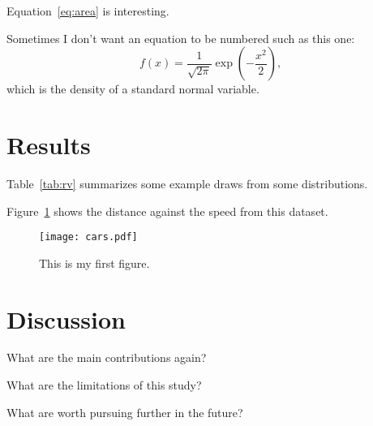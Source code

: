\documentclass[12pt]{article}
\begin{document}
Equation~\eqref{eq:area} is interesting. 

Sometimes I don't want an equation to be numbered such as this one:
\[
  f(x) = \frac{1}{\sqrt{2\pi}} \exp\left( - \frac{x^2}{2} \right),
\]
which is the density of a standard normal variable.



\section{Results}
\label{sec:resu}

Table~\ref{tab:rv} summarizes some example draws from some distributions.


Figure~\ref{fig:cars} shows the distance against the speed from this dataset.


\begin{figure}[tbp]
  \centering
  \texttt{[image: cars.pdf]}
  \caption{This is my first figure.}
  \label{fig:cars}
\end{figure}

\section{Discussion}
\label{sec:disc}

What are the main contributions again?

What are the limitations of this study?

What are worth pursuing further in the future?





\end{document}
